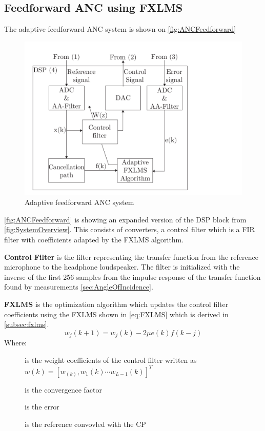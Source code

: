 \subsection*{Feedforward ANC using FXLMS}
The adaptive feedforward ANC system is shown on \autoref{fig:ANCFeedforward}
\begin{figure}[H]
	\centering
	\includegraphics[width=1\columnwidth]{figures/ArticleIllustrations/ANCFeedForward}
	\caption{Adaptive feedforward ANC system}
	\label{fig:ANCFeedforward}
\end{figure}
\autoref{fig:ANCFeedforward} is showing an expanded version of the DSP block from \autoref{fig:SystemOverview}. This consists of converters, a control filter which is a FIR filter with coefficients adapted by the FXLMS algorithm. 

\textbf{Control Filter} is the filter representing the transfer function from the reference microphone to the headphone loudspeaker. The filter is initialized with the inverse of the first 256 samples from the impulse response of the transfer function found by measurements \autoref{sec:AngleOfIncidence}.  

\textbf{FXLMS} is the optimization algorithm which updates the control filter coefficients using the FXLMS shown in \autoref{eq:FXLMS} which is derived in \autoref{subsec:fxlms}. 
\begin{equation}\label{eq:FXLMS}
w_j(k+1) = w_j(k) - 2\mu e(k)f(k-j)
\end{equation}
Where:
\begin{description}
	\item[] is the weight coefficients of the control filter written as  $w(k)=[w_(k),w_1(k) \cdots w_{L-1}(k)]^T$
	\item[\text{$\mu$}] is the convergence factor
	\item[] is the error 
	\item[] is the reference convovled with the CP
\end{description}


